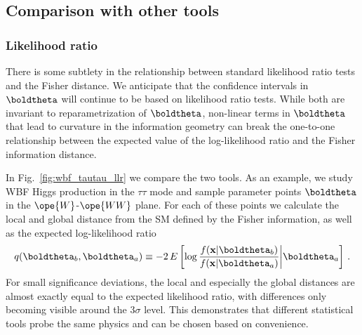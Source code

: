 \subsection{Comparison with other tools}

\subsubsection*{Likelihood ratio}

There is some subtlety in the relationship between 
standard likelihood ratio tests and the Fisher distance.
We anticipate that the confidence intervals in $\boldtheta$ will continue 
to be based on likelihood ratio tests.
While both are invariant to reparametrization of $\boldtheta$, 
 non-linear terms in $\boldtheta$ that lead to curvature in the information
geometry can break the one-to-one relationship between the 
expected value of the log-likelihood ratio and the Fisher information distance.

In Fig.~\ref{fig:wbf_tautau_llr} we compare the two tools. As an
example, we study WBF Higgs production in the $\tau \tau$ mode and
sample parameter points $\boldtheta$ in the $\ope{W}$-$\ope{WW}$
plane. For each of these points we calculate the local and global
distance from the SM defined by the Fisher information, as well as the
expected log-likelihood ratio 
%
\begin{align}
  q(\boldtheta_b , \boldtheta_a )
  \equiv -2 \, E \left[
  \log \frac { f(\mathbf{x}|\boldtheta_b) }   { f(\mathbf{x} |\boldtheta_a) }
  \middle | \boldtheta_a \right] \,.
\end{align}
%
For small significance deviations, the local and especially the global distances are 
almost exactly equal to the expected likelihood ratio, 
with differences only becoming visible around the $3 \sigma$ level. 
This demonstrates that different
statistical tools probe the same physics and can be chosen based on
convenience.

